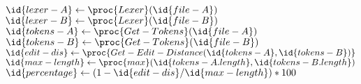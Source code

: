 \begin{codebox}
\li $\id{lexer-A} \gets \proc{Lexer}(\id{file-A})$
\li $\id{lexer-B} \gets \proc{Lexer}(\id{file-B})$
\li $\id{tokens-A} \gets \proc{Get-Tokens}(\id{file-A})$
\li $\id{tokens-B} \gets \proc{Get-Tokens}(\id{file-B})$
\li $\id{edit-dis} \gets \proc{Get-Edit-Distance(\id{tokens-A}, \id{tokens-B})}$
\li $\id{max-length} \gets \proc{max}(\id{tokens-A.length}, \id{tokens-B.length})$
\li $\id{percentage} \gets (1 - \id{edit-dis} /\id{max-length}) * 100$
\li \Return {}
\end{codebox}
